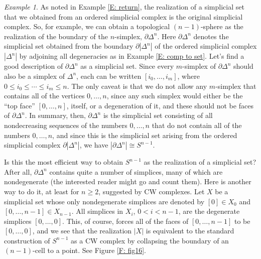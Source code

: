 \documentclass[12pt]{article}
\theoremstyle{plain}
\theoremstyle{definition}
\theoremstyle{remark}
\newtheorem{example}[theorem]{Example}
\newcommand{\bd}{\partial}
\begin{document}
\begin{example}\label{E: sphere}
As noted in Example \ref{E: return}, the realization of a simplicial set that we obtained from an ordered simplicial complex is the original simplicial complex. So, for example, we can obtain a topological $(n-1)$-sphere as the realization of the boundary of the $n$-simplex, $\bd \Delta^n$. Here $\bd \Delta^n$ denotes the simplicial set obtained from the boundary $\bd |\Delta^n|$ of the ordered simplicial complex $|\Delta^n|$ by adjoining all degeneracies as in Example \ref{E: comp to set}. 
Let's find a good description of $\bd \Delta^n$  as a simplicial set. Since every $m$-simplex of $\bd \Delta^n$ should also be a simplex of $\Delta^n$, each can be written $[i_0,\ldots, i_m]$, where $0\leq i_0\leq \cdots\leq i_m\leq n$. The only caveat is that we do not allow any $m$-simplex that contains all of the vertices $0,\ldots, n$, since any such simplex would either be the ``top face'' $[0,\ldots, n]$, itself, or a degeneration of it, and these should not be faces of $\bd \Delta^n$. In summary, then,  $\bd \Delta^n$ is the simplicial set consisting of all nondecreasing sequences of the numbers $0,\ldots,n$ that do not contain all of the numbers $0,\ldots ,n$, and since this is the simplicial set arising from the ordered simplicial complex $\bd |\Delta^n|$, we have $|\bd \Delta^n|\cong S^{n-1}$.

Is this the most efficient way to obtain $S^{n-1}$ as the realization of a simplicial set? After all, $\bd \Delta^n$ contains quite a number of simplices, many of which are nondegenerate (the interested reader might go and count them). Here is another way to do it, at least for $n\geq 2$, suggested by CW complexes. Let $X$ be a simplicial set whose only  nondegenerate simplices are denoted by $[0]\in X_0$ and $[0,\ldots, n-1]\in X_{n-1}$. All simplices in $X_i$, $0<i<n-1$, are the degenerate simplices $[0,\ldots, 0]$. This, of course, forces all of the faces of $[0,\ldots, n-1]$ to be $[0,\ldots, 0]$, and we see that the realization $|X|$  is equivalent to the standard construction of $S^{n-1}$ as a CW complex by collapsing the boundary of an $(n-1)$-cell to a point. See Figure \ref{F: fig16}. 


\end{example}
\end{document}
